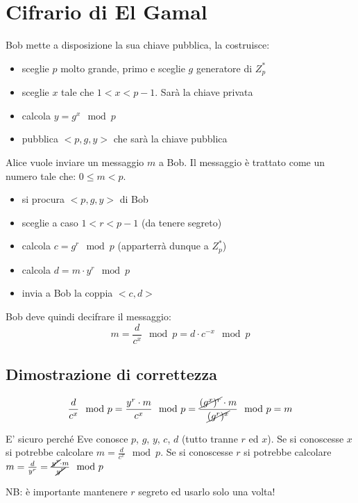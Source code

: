 \section{Cifrario di El Gamal}
Bob mette a disposizione la sua chiave pubblica, la costruisce:
\begin{itemize}
    \item sceglie $p$ molto grande, primo e sceglie $g$ generatore di $Z_p^*$
    \item sceglie $x$ tale che $1 < x < p-1$. Sarà la chiave privata
    \item calcola $y = g^x \mod p$
    \item pubblica $<p, g, y>$ che sarà la chiave pubblica
\end{itemize}

Alice vuole inviare un messaggio $m$ a Bob.
Il messaggio è trattato come un numero tale che: $0 \leq m < p$.
\begin{itemize}
    \item si procura $<p, g, y>$ di Bob
    \item sceglie a caso $1 < r < p-1$ (da tenere segreto)
    \item calcola $c = g^r \mod p$ (apparterrà dunque a $Z_p^*$)
    \item calcola $d = m \cdot y^r \mod p$
    \item invia a Bob la coppia $<c,d>$
\end{itemize}

Bob deve quindi decifrare il messaggio:
$$ m = \frac{d}{c^x} \mod p = d \cdot c^{-x} \mod p $$

\subsection{Dimostrazione di correttezza}
$$ \frac{d}{c^x} \mod p = \frac{y^r \cdot m}{c^x} \mod p = \frac{\cancel{(g^x)^r} \cdot m}{\cancel{(g^r)^x}} \mod p = m $$

E' sicuro perché Eve conosce $p$, $g$, $y$, $c$, $d$ (tutto tranne $r$ ed $x$).
Se si conoscesse $x$ si potrebbe calcolare $m = \frac{d}{c^x} \mod p$.
Se si conoscesse $r$ si potrebbe calcolare $m = \frac{d}{y^r} = \frac{\cancel{y^r} \cdot m}{\cancel{y^r}} \mod p$

NB: è importante mantenere $r$ segreto ed usarlo solo una volta!
